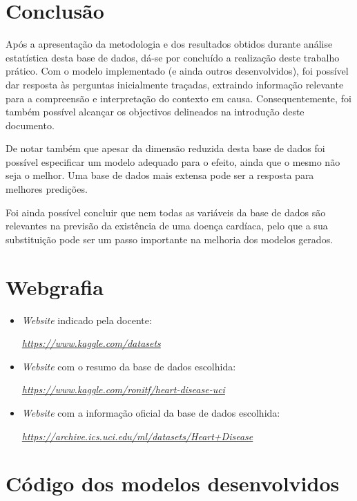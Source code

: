 \documentclass[a4paper]{report}
\begin{document}
\chapter{Conclusão}
\large{
	Após a apresentação da metodologia e dos resultados obtidos durante análise estatística desta base de dados, dá-se por concluído a realização deste trabalho prático. 
	Com o modelo implementado (e ainda outros desenvolvidos), foi possível dar resposta às perguntas inicialmente traçadas, extraindo informação relevante para a compreensão e interpretação do contexto em causa. 
	Consequentemente, foi também possível alcançar os objectivos delineados na introdução deste documento. 
	
	De notar também que apesar da dimensão reduzida desta base de dados foi possível especificar um modelo adequado para o efeito, ainda que o mesmo não seja o melhor. 
	Uma base de dados mais extensa pode ser a resposta para melhores predições.

	Foi ainda possível concluir que nem todas as variáveis da base de dados são relevantes na previsão da existência de uma doença cardíaca, pelo que a sua substituição pode ser um passo importante na melhoria dos modelos gerados.
}

\chapter{Webgrafia}
	\begin{itemize}
		\item \textit{Website} indicado pela docente:
		\par \textit{\url{https://www.kaggle.com/datasets}}
        \item \textit{Website} com o resumo da base de dados escolhida:
		\par \textit{\url{https://www.kaggle.com/ronitf/heart-disease-uci}}
		\item \textit{Website} com a informação oficial da base de dados escolhida:
		\par \textit{\url{https://archive.ics.uci.edu/ml/datasets/Heart+Disease}}
	\end{itemize}


\appendix
\chapter{Código dos modelos desenvolvidos}
\end{document}
